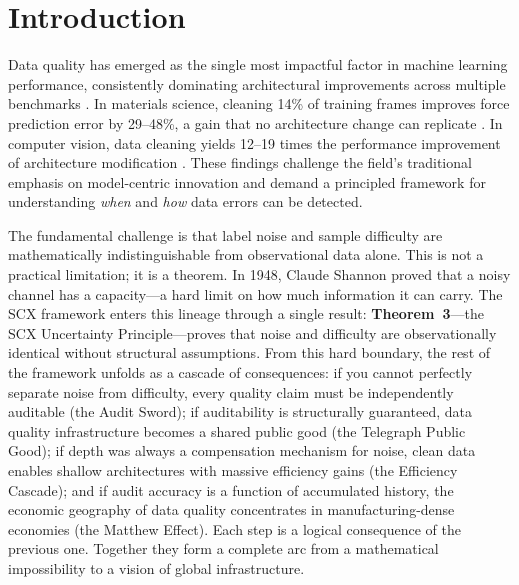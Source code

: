 \documentclass[twocolumn]{article}
\theoremstyle{definition}
\begin{document}
\section{Introduction}

Data quality has emerged as the single most impactful factor in machine learning performance, consistently dominating architectural improvements across multiple benchmarks \cite{paperIII, northcutt2021}. In materials science, cleaning 14\% of training frames improves force prediction error by 29--48\%, a gain that no architecture change can replicate \cite{paperIV}. In computer vision, data cleaning yields 12--19 times the performance improvement of architecture modification \cite{paperIII}. These findings challenge the field's traditional emphasis on model-centric innovation and demand a principled framework for understanding \emph{when} and \emph{how} data errors can be detected.

The fundamental challenge is that label noise and sample difficulty are mathematically indistinguishable from observational data alone. This is not a practical limitation; it is a theorem. In 1948, Claude Shannon proved that a noisy channel has a capacity---a hard limit on how much information it can carry. The SCX framework enters this lineage through a single result: \textbf{Theorem~3}---the SCX Uncertainty Principle---proves that noise and difficulty are observationally identical without structural assumptions. From this hard boundary, the rest of the framework unfolds as a cascade of consequences: if you cannot perfectly separate noise from difficulty, every quality claim must be independently auditable (the Audit Sword); if auditability is structurally guaranteed, data quality infrastructure becomes a shared public good (the Telegraph Public Good); if depth was always a compensation mechanism for noise, clean data enables shallow architectures with massive efficiency gains (the Efficiency Cascade); and if audit accuracy is a function of accumulated history, the economic geography of data quality concentrates in manufacturing-dense economies (the Matthew Effect). Each step is a logical consequence of the previous one. Together they form a complete arc from a mathematical impossibility to a vision of global infrastructure.
\end{document}
